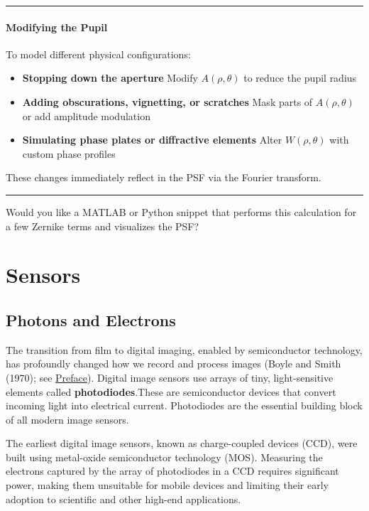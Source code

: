 \documentclass[
  letterpaper,
]{book}
\providecommand{\tightlist}{%
  \setlength{\itemsep}{0pt}\setlength{\parskip}{0pt}}\usepackage{longtable,booktabs,array}
\begin{document}
\begin{center}\rule{0.5\linewidth}{0.5pt}\end{center}

\subsection{Modifying the Pupil}\label{modifying-the-pupil}

To model different physical configurations:

\begin{itemize}
\tightlist
\item
  \textbf{Stopping down the aperture} Modify \(A(\rho, \theta)\) to
  reduce the pupil radius
\item
  \textbf{Adding obscurations, vignetting, or scratches} Mask parts of
  \(A(\rho, \theta)\) or add amplitude modulation
\item
  \textbf{Simulating phase plates or diffractive elements} Alter
  \(W(\rho, \theta)\) with custom phase profiles
\end{itemize}

These changes immediately reflect in the PSF via the Fourier transform.

\begin{center}\rule{0.5\linewidth}{0.5pt}\end{center}

Would you like a MATLAB or Python snippet that performs this calculation
for a few Zernike terms and visualizes the PSF?

\part{Sensors}

\chapter{Photons and Electrons}\label{sec-sensors-photons-electrons}

The transition from film to digital imaging, enabled by semiconductor
technology, has profoundly changed how we record and process images
(Boyle and Smith (1970); see \hyperref[sec-preface]{Preface}). Digital
image sensors use arrays of tiny, light-sensitive elements called
\textbf{photodiodes}.These are semiconductor devices that convert
incoming light into electrical current. Photodiodes are the essential
building block of all modern image sensors.

The earliest digital image sensors, known as charge-coupled devices
(CCD), were built using metal-oxide semiconductor technology (MOS).
Measuring the electrons captured by the array of photodiodes in a CCD
requires significant power, making them unsuitable for mobile devices
and limiting their early adoption to scientific and other high-end
applications.
\end{document}
